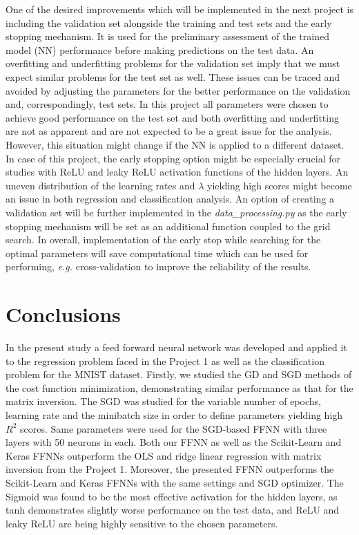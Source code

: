 \documentclass{emulateapj}
\begin{document}
One of the desired improvements which will be implemented in the next project is including the validation set alongside the training and test sets and the early stopping mechanism. It is used for the preliminary assessment of the trained model (NN) performance before making predictions on the test data. An overfitting and underfitting problems for the validation set imply that we must expect similar problems for the test set as well. These issues can be traced and avoided by adjusting the parameters for the better performance on the validation and, correspondingly, test sets. In this project all parameters were chosen to achieve good performance on the test set and both overfitting and underfitting are not as apparent and are not expected to be a great issue for the analysis. However, this situation might change if the NN is applied to a different dataset. In case of this project, the early stopping option might be especially crucial for studies with ReLU and leaky ReLU activation functions of the hidden layers. An uneven distribution of the learning rates and $\lambda$ yielding high scores might become an issue in both regression and classification analysis. An option of creating a validation set will be further implemented in the \textit{data\_processing.py} as the early stopping mechanism will be set as an additional function coupled to the grid search. In overall, implementation of the early stop while searching for the optimal parameters will save computational time which can be used for performing, \textit{e.g.} cross-validation to improve the reliability of the results.

\section{Conclusions} 
\label{sec: Conclusions}

In the present study a feed forward neural network was developed and applied it to the regression problem faced in the Project 1 as well as the classification problem for the MNIST dataset. Firstly, we studied the GD and SGD methods of the cost function minimization, demonstrating similar performance as that for the matrix inversion. The SGD was studied for the variable number of epochs, learning rate and the minibatch size in order to define parameters yielding high $R^2$ scores. Same parameters were used for the SGD-based FFNN with three layers with 50 neurons in each. Both our FFNN as well as the Scikit-Learn and Keras FFNNs outperform the OLS and ridge linear regression with matrix inversion from the Project 1. Moreover, the presented FFNN outperforms the Scikit-Learn and Keras FFNNs with the same settings and SGD optimizer. The Sigmoid was found to be the most effective activation for the hidden layers, as tanh demonstrates slightly worse performance on the test data, and ReLU and leaky ReLU are being highly sensitive to the chosen parameters.
\end{document}
